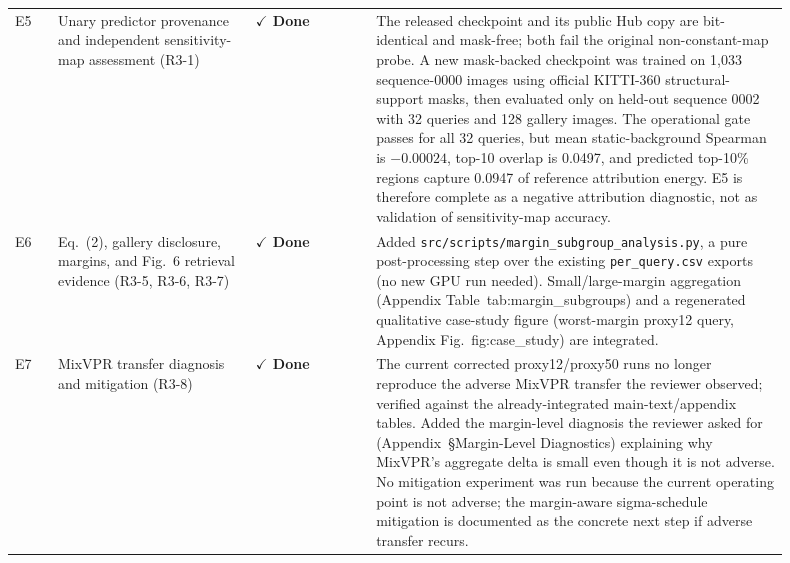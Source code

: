 \documentclass[11pt]{article}
\newcommand{\done}{\textcolor{DoneGreen}{\textbf{$\checkmark$ Done}}}
\begin{document}
\begin{longtable}{@{}p{0.05\linewidth}p{0.23\linewidth}p{0.14\linewidth}p{0.48\linewidth}@{}}
E5 & Unary predictor provenance and independent sensitivity-map assessment (R3-1) & \done & The released checkpoint and its public Hub copy are bit-identical and mask-free; both fail the original non-constant-map probe. A new mask-backed checkpoint was trained on 1,033 sequence-0000 images using official KITTI-360 structural-support masks, then evaluated only on held-out sequence 0002 with 32 queries and 128 gallery images. The operational gate passes for all 32 queries, but mean static-background Spearman is $-0.00024$, top-10 overlap is 0.0497, and predicted top-10\% regions capture 0.0947 of reference attribution energy. E5 is therefore complete as a negative attribution diagnostic, not as validation of sensitivity-map accuracy. \\
E6 & Eq.~(2), gallery disclosure, margins, and Fig.~6 retrieval evidence (R3-5, R3-6, R3-7) & \done & Added \texttt{src/scripts/margin\_subgroup\_analysis.py}, a pure post-processing step over the existing \texttt{per\_query.csv} exports (no new GPU run needed). Small/large-margin aggregation (Appendix Table~tab:margin\_subgroups) and a regenerated qualitative case-study figure (worst-margin proxy12 query, Appendix Fig.~fig:case\_study) are integrated. \\
E7 & MixVPR transfer diagnosis and mitigation (R3-8) & \done & The current corrected proxy12/proxy50 runs no longer reproduce the adverse MixVPR transfer the reviewer observed; verified against the already-integrated main-text/appendix tables. Added the margin-level diagnosis the reviewer asked for (Appendix~\S Margin-Level Diagnostics) explaining why MixVPR's aggregate delta is small even though it is not adverse. No mitigation experiment was run because the current operating point is not adverse; the margin-aware sigma-schedule mitigation is documented as the concrete next step if adverse transfer recurs. \\
\end{longtable}
\end{document}
